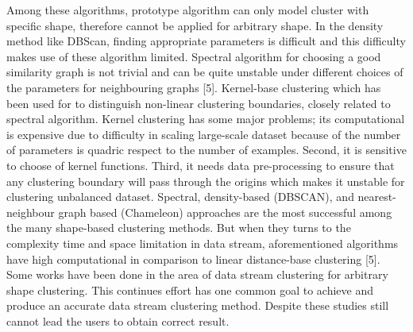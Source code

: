 Among these algorithms, prototype algorithm can only model cluster with specific shape, therefore cannot be applied for arbitrary shape. In the density method like DBScan, finding appropriate parameters is difficult and this difficulty makes use of these algorithm limited. Spectral algorithm for choosing a good similarity graph is not trivial and can be quite unstable under different choices of the parameters for neighbouring graphs [5]. Kernel-base clustering which has been used for to distinguish non-linear clustering boundaries, closely related to spectral algorithm. Kernel clustering has some major problems; its computational is expensive due to difficulty in scaling large-scale dataset because of the number of parameters is quadric respect to the number of examples. Second, it is sensitive to choose of kernel functions. Third, it needs data pre-processing to ensure that any clustering boundary will pass through the origins which makes it unstable for clustering unbalanced dataset. Spectral, density-based (DBSCAN), and nearest-neighbour graph based (Chameleon) approaches are the most successful among the many shape-based clustering methods. But when they turns to the complexity time and space limitation in data stream, aforementioned algorithms have high computational in comparison to linear distance-base clustering [5].
Some works have been done in the area of data stream clustering for arbitrary shape clustering. This continues effort has one common goal to achieve and produce an accurate data stream clustering method. Despite these studies still cannot lead the users to obtain correct result.